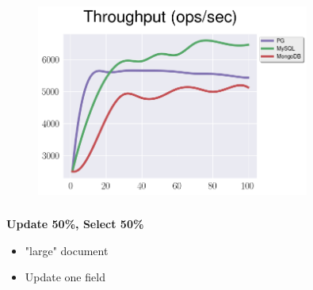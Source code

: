 \documentclass[usenames,dvipsnames, 18pt, compress, aspectratio=169]{beamer}
\begin{document}

\begin{frame}
    \frametitle{}
    \begin{center}
    \vspace{10pt}
    \begin{figure}
        \includegraphics[width=0.8\textwidth,center]{benchmarks/update_btree_wal_size.png}
    \end{figure}
    \end{center}
\end{frame}

\begin{frame}
    \frametitle{}
    \begin{center}
        \textbf{Update 50\%, Select 50\%}
        \begin{itemize}[label={}]
            \item "large" document
            \item Update one field
        \end{itemize}
    \end{center}
\end{frame}
\end{document}
